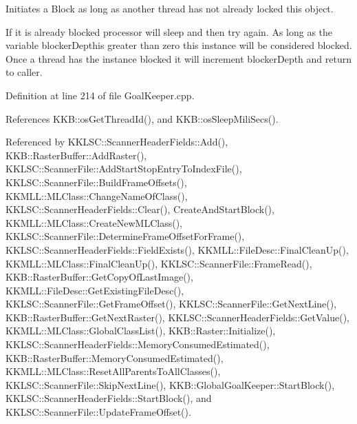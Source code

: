 Initiates a Block as long as another thread has not already locked this object. 

If it is already blocked processor will sleep and then try again. As long as the variable \textquotesingle{}blocker\+Depth\textquotesingle{}is greater than zero this instance will be considered blocked. Once a thread has the instance blocked it will increment \textquotesingle{}blocker\+Depth\textquotesingle{} and return to caller. 

Definition at line 214 of file Goal\+Keeper.\+cpp.



References K\+K\+B\+::os\+Get\+Thread\+Id(), and K\+K\+B\+::os\+Sleep\+Mili\+Secs().



Referenced by K\+K\+L\+S\+C\+::\+Scanner\+Header\+Fields\+::\+Add(), K\+K\+B\+::\+Raster\+Buffer\+::\+Add\+Raster(), K\+K\+L\+S\+C\+::\+Scanner\+File\+::\+Add\+Start\+Stop\+Entry\+To\+Index\+File(), K\+K\+L\+S\+C\+::\+Scanner\+File\+::\+Build\+Frame\+Offsets(), K\+K\+M\+L\+L\+::\+M\+L\+Class\+::\+Change\+Name\+Of\+Class(), K\+K\+L\+S\+C\+::\+Scanner\+Header\+Fields\+::\+Clear(), Create\+And\+Start\+Block(), K\+K\+M\+L\+L\+::\+M\+L\+Class\+::\+Create\+New\+M\+L\+Class(), K\+K\+L\+S\+C\+::\+Scanner\+File\+::\+Determine\+Frame\+Offset\+For\+Frame(), K\+K\+L\+S\+C\+::\+Scanner\+Header\+Fields\+::\+Field\+Exists(), K\+K\+M\+L\+L\+::\+File\+Desc\+::\+Final\+Clean\+Up(), K\+K\+M\+L\+L\+::\+M\+L\+Class\+::\+Final\+Clean\+Up(), K\+K\+L\+S\+C\+::\+Scanner\+File\+::\+Frame\+Read(), K\+K\+B\+::\+Raster\+Buffer\+::\+Get\+Copy\+Of\+Last\+Image(), K\+K\+M\+L\+L\+::\+File\+Desc\+::\+Get\+Existing\+File\+Desc(), K\+K\+L\+S\+C\+::\+Scanner\+File\+::\+Get\+Frame\+Offset(), K\+K\+L\+S\+C\+::\+Scanner\+File\+::\+Get\+Next\+Line(), K\+K\+B\+::\+Raster\+Buffer\+::\+Get\+Next\+Raster(), K\+K\+L\+S\+C\+::\+Scanner\+Header\+Fields\+::\+Get\+Value(), K\+K\+M\+L\+L\+::\+M\+L\+Class\+::\+Global\+Class\+List(), K\+K\+B\+::\+Raster\+::\+Initialize(), K\+K\+L\+S\+C\+::\+Scanner\+Header\+Fields\+::\+Memory\+Consumed\+Estimated(), K\+K\+B\+::\+Raster\+Buffer\+::\+Memory\+Consumed\+Estimated(), K\+K\+M\+L\+L\+::\+M\+L\+Class\+::\+Reset\+All\+Parents\+To\+All\+Classes(), K\+K\+L\+S\+C\+::\+Scanner\+File\+::\+Skip\+Next\+Line(), K\+K\+B\+::\+Global\+Goal\+Keeper\+::\+Start\+Block(), K\+K\+L\+S\+C\+::\+Scanner\+Header\+Fields\+::\+Start\+Block(), and K\+K\+L\+S\+C\+::\+Scanner\+File\+::\+Update\+Frame\+Offset().


